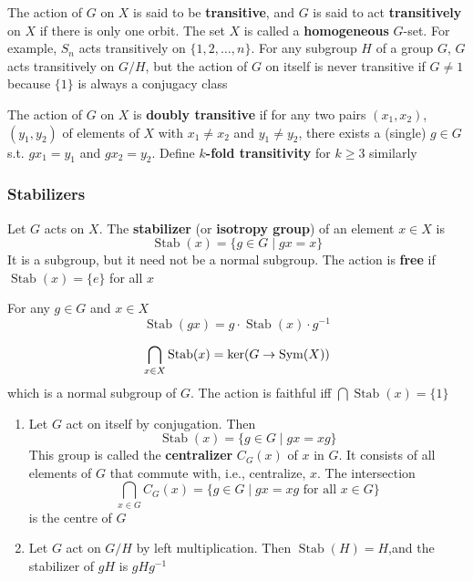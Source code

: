 \documentclass[11pt]{article}
\DeclareMathOperator{\Stab}{Stab}
\begin{document}
The action of \(G\) on \(X\) is said to be \textbf{transitive}, and \(G\) is said to act \textbf{transitively}
on \(X\) if there is only one orbit. The set \(X\) is called a \textbf{homogeneous} \(G\)-set. For
example, \(S_n\) acts transitively on \(\{1,2,\dots,n\}\). For any subgroup \(H\) of a
group \(G\), \(G\) acts transitively on \(G/H\), but the action of \(G\) on itself is never
transitive if \(G\neq 1\) because \(\{1\}\) is always a conjugacy class

The action of \(G\) on \(X\) is \textbf{doubly transitive} if for any two pairs \((x_1,x_2)\), \((y_1,y_2)\)
of elements of \(X\) with \(x_1\neq x_2\) and \(y_1\neq y_2\), there exists a (single) \(g\in G\)
s.t. \(gx_1=y_1\) and \(gx_2=y_2\). Define \textbf{\(k\)-fold transitivity} for \(k\ge 3\) similarly

\subsubsection{Stabilizers}
\label{sec:orga39b098}
Let \(G\) acts on \(X\). The \textbf{stabilizer} (or \textbf{isotropy group}) of an element \(x\in X\) is
\begin{equation*}
\Stab(x)=\{g\in G\mid gx=x\}
\end{equation*}
It is a subgroup, but it need not be a normal subgroup. The action is \textbf{free} if \(\Stab(x)=\{e\}\)
for all \(x\)

\begin{lemma}[]
\label{4.4}
For any \(g\in G\) and \(x\in X\)
\begin{equation*}
\Stab(gx)=g\cdot\Stab(x)\cdot g^{-1}
\end{equation*}
\end{lemma}


\begin{equation*}
\bigcap_{x\in X}\Stab(x)=\ker(G\to\Sym(X))
\end{equation*}
which is a normal subgroup of \(G\). The action is faithful iff \(\bigcap\Stab(x)=\{1\}\)

\begin{examplle}[]
\begin{enumerate}
\item Let \(G\) act on itself by conjugation. Then
\begin{equation*}
\Stab(x)=\{g\in G\mid gx=xg\}
\end{equation*}
This group is called the \textbf{centralizer} \(C_G(x)\) of \(x\) in \(G\). It consists of all
elements of \(G\) that commute with, i.e., centralize, \(x\). The intersection
\begin{equation*}
\bigcap_{x\in G}C_G(x)=\{g\in G\mid gx=xg\text{ for all }x\in G\}
\end{equation*}
is the centre of \(G\)
\item Let \(G\) act on \(G/H\) by left multiplication. Then \(\Stab(H)=H\),and the stabilizer
of \(gH\) is \(gHg^{-1}\)
\end{enumerate}
\end{examplle}
\end{document}
